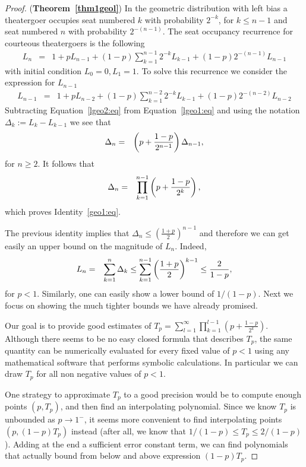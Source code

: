 \documentclass[11pt]{llncs}
\begin{document}
\begin{proof} ({\bf Theorem~\ref{thm1geol}})
In the geometric distribution with left bias a theatergoer
occupies seat numbered $k$ with probability
$2^{-k}$, for $k \leq n-1$ and seat numbered $n$
with probability $2^{-(n-1)}$. 
The seat occupancy
recurrence for courteous theatergoers is the following
\begin{eqnarray}
L_n &=& \label{lgeo1:eq}
1 + p L_{n-1} + (1-p) \sum_{k=1}^{n-1} 2^{-k}L_{k-1} + (1-p)2^{-(n-1)}L_{n-1}
\end{eqnarray}
with initial condition $L_0=0, L_1 = 1$.
To solve this recurrence we consider the expression for $L_{n-1}$
\begin{eqnarray}
L_{n-1} &=& \label{lgeo2:eq}
1 + p L_{n-2} + (1-p) \sum_{k=1}^{n-2} 2^{-k}L_{k-1} + (1-p)2^{-(n-2)}L_{n-2}
\end{eqnarray}
Subtracting Equation~\eqref{lgeo2:eq} from Equation~\eqref{lgeo1:eq}
and using the notation $\Delta_k := L_k - L_{k-1}$ we see that
\begin{eqnarray}
\Delta_n &=& \notag
\left( p + \frac{1-p}{2^{n-1}} \right) \Delta_{n-1} , 
\end{eqnarray}
for $n \geq 2$.
It follows that
\begin{eqnarray}
\Delta_n &=& \notag
\prod_{k=1}^{n-1} \left( p + \frac{1-p}{2^{k}} \right)  , 
\end{eqnarray}
which proves Identity~\eqref{geo1:eq}.

The previous identity implies that
$\Delta_n \leq \left(\frac{1+p}{2}\right)^{n-1}$ and therefore
we can get easily an upper bound on the magnitude of
$L_n$. Indeed,
\begin{eqnarray}
L_n &=& \notag
\sum_{k=1}^n \Delta_k 
\leq
\sum_{k=1}^{n-1} \left( \frac{1+p}{2} \right)^{k-1}
\leq
\frac{2}{1-p} ,
\end{eqnarray}
for $p<1$. Similarly, one can easily show a lower bound of $1/(1-p)$. Next we focus on showing the much tighter bounds we have already promised. 

Our goal is to provide good estimates of $T_p = \sum_{l=1}^\infty \prod_{k=1}^{l-1} \left( p + \frac{1-p}{2^{k}} \right)$. Although there seems to be no easy closed formula that describes $T_p$, the same quantity can be numerically evaluated for every fixed value of $p<1$ using any mathematical software that performs symbolic calculations. In particular we can draw $T_p$ for all non negative values of $p<1$. 

One strategy to approximate $T_p$ to a good precision would be to compute enough points $(p,T_p)$, and then find an interpolating polynomial. Since we know $T_p$ is unbounded as $p\rightarrow 1^-$, it seems more convenient to find interpolating points $(p,(1-p)T_p)$ instead (after all, we know that $1/(1-p) \leq T_p \leq 2/(1-p)$). Adding at the end a sufficient error constant term, we can find polynomials that actually bound from below and above expression $(1-p)T_p$. 


\end{proof}
\end{document}
